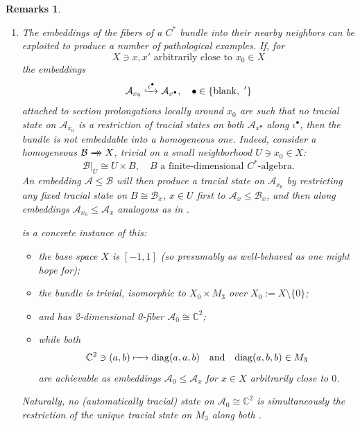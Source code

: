 \documentclass[11pt,leqno]{article}
\theoremstyle{plain}
\theoremstyle{plain}
\theoremstyle{plain}
\newtheorem{remarks}[lemma]{Remarks}
\numberwithin{equation}{section}
\theoremstyle{nonumberplain}
\newcommand\bC{{\mathbb C}}
\newcommand\cA{{\mathcal A}}
\newcommand\cB{{\mathcal B}}
\newcommand\1{{\bf 1}}
\newcommand{\xrightarrowdbl}[2][]{%
  \xrightarrow[#1]{#2}\mathrel{\mkern-14mu}\rightarrow
}
\begin{document}
\begin{remarks}\label{res:emb.germ}
  \begin{enumerate}[(1),wide]
  \item   The embeddings  of the fibers of a $C^*$ bundle into their nearby neighbors can be exploited to produce a number of pathological examples. If, for
    \begin{equation*}
      X\ni x,x'
      \text{ arbitrarily close to }
      x_0\in X
    \end{equation*}
    the embeddings
    \begin{equation*}
      \cA_{x_0}\lhook\joinrel\xrightarrow{\iota^{\bullet}} \cA_{x^{\bullet}}
      ,\quad
      \bullet\in\left\{\text{blank},\ '\right\}
    \end{equation*}
    attached to section prolongations locally around $x_0$ are such that no tracial state on $\cA_{x_0}$ is a restriction of tracial states on both $\cA_{x^\bullet}$ along $\iota^{\bullet}$, then the bundle is not embeddable into a homogeneous one. Indeed, consider a homogeneous $\cB\xrightarrowdbl{}X$, trivial on a small neighborhood $U\ni x_0\in X$:
    \begin{equation*}
      \cB|_U\cong U\times B
      ,\quad
      B\text{ a finite-dimensional $C^*$-algebra}.
    \end{equation*}
    An embedding $\cA\le \cB$ will then produce a tracial state on $\cA_{x_0}$ by restricting any fixed tracial state on $B\cong \cB_x$, $x\in U$ first to $\cA_x\le \cB_x$, and then along embeddings $\cA_{x_0}\le \cA_x$ analogous as in . 

    \cite[Example 2.2]{2409.03531v1} is a concrete instance of this:
    \begin{itemize}[wide]
    \item the base space $X$ is $[-1,1]$ (so presumably as well-behaved as one might hope for);

    \item the bundle is trivial, isomorphic to $X_0\times M_3$ over $X_0:=X\setminus \{0\}$;

    \item and has 2-dimensional 0-fiber $\cA_0\cong \bC^2$;

    \item while both
      \begin{equation}\label{eq:2conflicting}
        \bC^2\ni (a,b)
        \xmapsto{\quad}
        \mathrm{diag}(a,a,b)
        \quad\text{and}\quad
        \mathrm{diag}(a,b,b)
        \in M_3
      \end{equation}
      are achievable as embeddings $\cA_0\le \cA_x$ for $x\in X$ arbitrarily close to $0$. 
    \end{itemize}
    Naturally, no (automatically tracial) state on $\cA_0\cong \bC^2$ is simultaneously the restriction of the unique tracial state on $M_3$ along both .



\end{enumerate}
\end{remarks}
\end{document}
